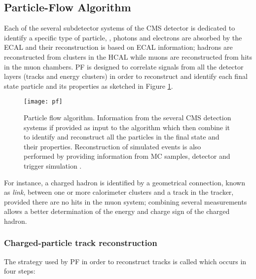 \subsection{Particle-Flow Algorithm}

Each of the several subdetector systems of the CMS detector is dedicated to identify a specific type of particle, \ie, photons and electrons are absorbed by the ECAL and their reconstruction is based on ECAL information; hadrons are reconstructed from clusters in the HCAL while muons are reconstructed from hits in the muon chambers. PF is designed to correlate signals from all the detector layers (tracks and energy clusters) in order to reconstruct and identify each final state particle and its properties as sketched in Figure \ref{fig:pf}.

\begin{figure}[!h]
  \centering
  \texttt{[image: pf]}
  \caption[Particle flow algorithm.]{Particle flow algorithm. Information from the several CMS detection systems if provided as input to the algorithm which then combine it to identify and reconstruct all the particles in the final state and their properties. Reconstruction of simulated events is also performed by providing information from MC samples, detector and trigger simulation \cite{pfdiag}.}\label{fig:pf}
\end{figure}

For instance, a charged hadron is identified by a geometrical connection, known as \textit{link}, between one or more calorimeter clusters and a track in the tracker, provided there are no hits in the muon system; combining several measurements allows a better determination of the energy and charge sign of the charged hadron.   


\subsubsection*{Charged-particle track reconstruction}

The strategy used by PF in order to reconstruct tracks is called  which occurs in four steps:

